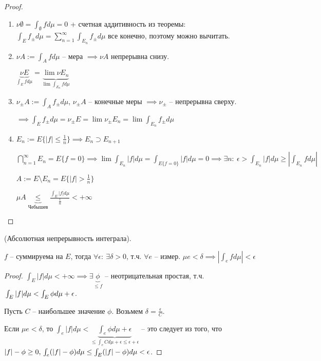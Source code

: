 \begin{proof}
    \begin{enumerate}
        \item $\nu \emptyset = \int_{\emptyset}{f d \mu} = 0$ + счетная аддитивность из теоремы: $\int_{E}{f_{\pm} d \mu} = \sum_{n=1}^{\infty} \int_{E_n}{f_{\pm} d \mu}$ все конечно, поэтому можно вычитать.
        \item {
            $\nu A := \int_A{f d \mu}$ -- мера $\implies \nu A$ непрерывна снизу.

            $\underbrace{\nu E}_{\int_E{f d \mu}} = \underbrace{\lim {\nu E_n}}_{\lim{\int_{E_n}{f d \mu}}}$
        }
        \item {
            $\nu_{\pm} A := \int_{A}{f_{\pm} d \mu}$, $\nu_{\pm} A$ -- конечные меры $\implies \nu_{\pm}$ -- непрерывна сверху.

            $\implies \int_E{f_{\pm} d \mu} = \nu_{\pm}E = \lim \nu_{\pm} E_n = \lim{\int_{E_n}{f_{\pm} d \mu}}$
        }
        \item {
            $E_n := E \{ |f| \leq \frac{1}{n} \} \implies E_n \supset E_{n+1}$

            $\bigcap_{n=1}^{\infty}E_n = E\{ f = 0 \} \implies \lim{\int_{E_n}{|f| d \mu}} = \int_{E\{ f = 0 \}}{|f| d \mu} = 0 \implies \exists n: \ \epsilon > \int_{E_n}{|f| d \mu} \geq \left| \int_{E_n}{f d \mu} \right|$

            $A := E \setminus E_n = E \{ |f| > \frac{1}{n} \}$

            $\mu A \underbrace{\leq}_{\text{Чебышев}} \frac{\int_E{|f|d \mu}}{\frac{1}{n}} < +\infty$
        }
    \end{enumerate}
\end{proof}

\begin{theorem}
    (Абсолютная непрерывность интеграла).

    $f$ -- суммируема на $E$, тогда $\forall \epsilon: \ \exists \delta > 0$, т.ч. $\forall e $ -- измер. $\mu e < \delta \implies | \int_e f d \mu | < \epsilon$
\end{theorem}
\begin{proof}
    $\int_E |f| d \mu < +\infty \implies \exists \underbrace{\phi}_{\leq f}$ -- неотрицательная простая, т.ч. $\\ \int_E |f| d \mu < \int_E \phi d \mu + \epsilon$.

    Пусть $C$ -- наибольшее значение $\phi$. Возьмем $\delta = \frac{\epsilon}{C}$.

    Если $\mu e < \delta$, то $\int_e |f| d \mu < \underbrace{\int_e \phi d \mu + \epsilon}_{\leq \int_e C d \mu + \epsilon \leq \epsilon + \epsilon}$ -- это следует из того, что $|f| - \phi \geq 0, \\ \int_{e} (|f| - \phi) d \mu \leq \int_E (|f| - \phi) d \mu < \epsilon$.
\end{proof}

